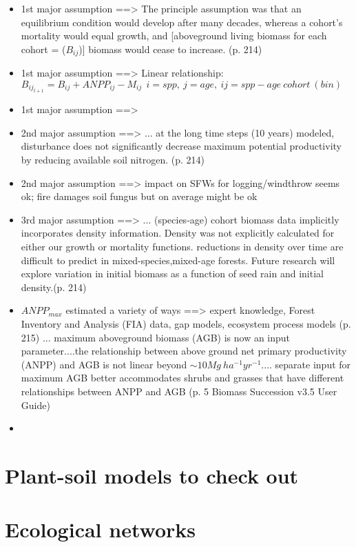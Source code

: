 \documentclass[twoside]{article}	%
\begin{document}
\begin{itemize}
  \item 1st major assumption ==> The principle assumption was that an equilibrium condition would develop after many decades, whereas a cohort's mortality would equal growth, and [aboveground living biomass for each cohort = ($B_{ij}$)] biomass would cease to increase. (p. 214) 
  \item 1st major assumption ==> Linear relationship: $B_{ij_{t+1}} = B_{ij} + ANPP_{ij} - M_{ij} \ \ i = spp ,\ j= age, \ ij=spp-age \ cohort \ (bin) $
  \item 1st major assumption ==> 
  \item 2nd major assumption ==> ... at the long time steps (10 years) modeled, disturbance does not significantly decrease maximum potential productivity by reducing available soil nitrogen. (p. 214)
  \item 2nd major assumption ==> impact on SFWs for logging/windthrow seems ok; fire damages soil fungus but on average might be ok
  \item 3rd major assumption ==> ... (species-age) cohort biomass data implicitly incorporates density information. Density was not explicitly calculated for either our growth or mortality functions. reductions in density over time are difficult to predict in mixed-species,mixed-age forests. Future research will explore variation in initial biomass as a function of seed rain and initial density.(p. 214)
  \item $ANPP_{max}$ estimated a variety of ways ==> expert knowledge, Forest Inventory and Analysis (FIA) data, gap models, ecosystem process models (p. 215) ... maximum aboveground biomass (AGB) is now an input parameter....the relationship between above ground net primary productivity (ANPP) and AGB is not linear beyond $\sim 10 Mg \ ha^{-1} yr^{-1}$.... separate input for maximum AGB better accommodates shrubs and grasses that have different relationships between ANPP and AGB (p. 5 Biomass Succession v3.5 User Guide)
  \item 
\end{itemize}


\section{Plant-soil models to check out}


\section{Ecological networks}
\end{document}
